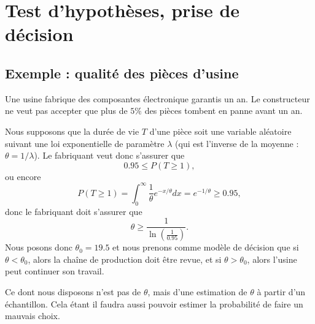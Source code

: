 \section{Test d'hypothèses, prise de décision}

\subsection{Exemple : qualité des pièces d'usine}

Une usine fabrique des composantes électronique garantis un an. Le constructeur ne veut pas accepter que plus de \( 5\%\) des pièces tombent en panne avant un an.

Nous supposons que la durée de vie \( T\) d'une pièce soit une variable aléatoire suivant une loi exponentielle de paramètre \( \lambda\) (qui est l'inverse de la moyenne : \( \theta=1/\lambda\)). Le fabriquant veut donc s'assurer que
\begin{equation}
    0.95\leq P(T\geq 1),
\end{equation}
ou encore
\begin{equation}
    P(T\geq 1)=\int_0^{\infty}\frac{1}{ \theta } e^{-x/\theta}dx= e^{-1/\theta}\geq 0.95,
\end{equation}
donc le fabriquant doit s'assurer que
\begin{equation}
    \theta\geq\frac{1}{ \ln\left( \frac{1}{ 0.95 } \right) }.
\end{equation}
Nous posons donc \( \theta_0=19.5\) et nous prenons comme modèle de décision que si \( \theta<\theta_0\), alors la chaîne de production doit être revue, et si \( \theta>\theta_0\), alors l'usine peut continuer son travail.

Ce dont nous disposons n'est pas de \( \theta\), mais d'une estimation de \( \theta\) à partir d'un échantillon. Cela étant il faudra aussi pouvoir estimer la probabilité de faire un mauvais choix.

